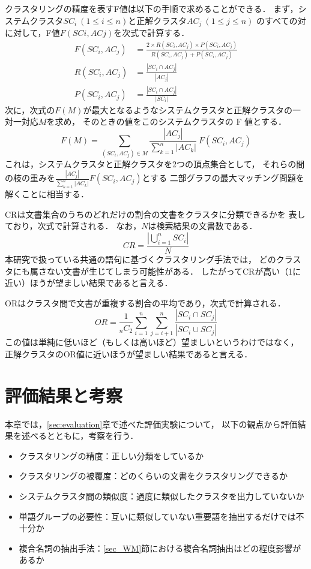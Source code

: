 \documentclass[japanese]{jnlp_1.4}
\begin{document}
{クラスタリングの精度を表すF値は以下の手順で求めることができる\cite{Orihara08}．
まず，システムクラスタ$SC_i\ (1 \leq i \leq n)$と正解クラスタ$AC_j\ (1 \leq j \leq n)$
のすべての対に対して，F値$F(SCi,ACj)$を次式で計算する．
\begin{align}
F(SC_i, AC_j) &= \frac{2 \times R(SC_i, AC_j) \times P(SC_i, AC_j)}{R(SC_i, AC_j) + P(SC_i, AC_j)}\\
R(SC_i, AC_j) &= \frac{|SC_i \cap AC_j|}{|AC_j|}\\
P(SC_i, AC_j) &= \frac{|SC_i \cap AC_j|}{|SC_i|}
\end{align}
次に，次式の$F(M)$が最大となるようなシステムクラスタと正解クラスタの一対一対応$M$を求め，
そのときの値をこのシステムクラスタの F 値とする．
\begin{equation}
  F(M) = \sum_{(SC_i,AC_j)\in{M}} \frac{|AC_j|}{\sum_{k=1}^n |AC_k|}\ F(SC_i,AC_j)
\end{equation}
これは，システムクラスタと正解クラスタを2つの頂点集合として，
それらの間の枝の重みを$\frac{|AC_j|}{\sum_{k=1}^n |AC_k|}F(SC_i, AC_j)$とする
二部グラフの最大マッチング問題を解くことに相当する．

CRは文書集合のうちのどれだけの割合の文書をクラスタに分類できるかを
表しており，次式で計算される\cite{Narita03}．
なお，{$N$}は検索結果の文書数である．
\begin{equation}
CR = \frac{\displaystyle\left|\bigcup_{i=1}^n SC_i\right|}{N}
\end{equation}
本研究で扱っている共通の語句に基づくクラスタリング手法では，
どのクラスタにも属さない文書が生じてしまう可能性がある．
したがってCRが高い（1に近い）ほうが望ましい結果であると言える．

ORはクラスタ間で文書が重複する割合の平均であり，次式で計算される．
\begin{equation}
OR = \frac{1}{{ }_n{C}_2} \sum_{i=1}^n \sum_{j=i+1}^n \frac{|SC_i \cap SC_j|}{|SC_i \cup SC_j|}
\end{equation}
この値は単純に低いほど（もしくは高いほど）望ましいというわけではなく，
正解クラスタのOR値に近いほうが望ましい結果であると言える．



\section{評価結果と考察}

本章では，\ref{sec:evaluation}章で述べた評価実験について，
以下の観点から評価結果を述べるとともに，考察を行う．

\begin{itemize}
\item クラスタリングの精度：正しい分類をしているか
\item クラスタリングの被覆度：どのくらいの文書をクラスタリングできるか
\item システムクラスタ間の類似度：過度に類似したクラスタを出力していないか
\item 単語グループの必要性：互いに類似していない重要語を抽出するだけでは不十分か
\item 複合名詞の抽出手法：\ref{sec_WM}節における複合名詞抽出はどの程度影響があるか
\end{itemize}

}
\end{document}
